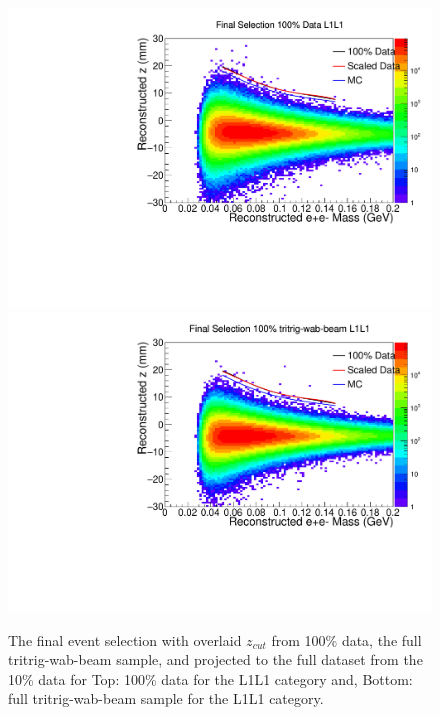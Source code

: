 \begin{figure}[t]
    \centering
    \includegraphics[width=.85\textwidth]{figs/Results/unblind_L1L1_final_zcut.pdf}
    \includegraphics[width=.85\textwidth]{figs/Results/mc_L1L1_final_vz_mass_zcut.pdf}
    \caption{The final event selection with overlaid $z_{cut}$ from 100\% data, the full tritrig-wab-beam sample, and projected to the full dataset from the 10\% data for Top: 100\% data for the L1L1 category and, Bottom: full tritrig-wab-beam sample for the L1L1 category.}
    \label{fig:final_zcut}
\end{figure}


